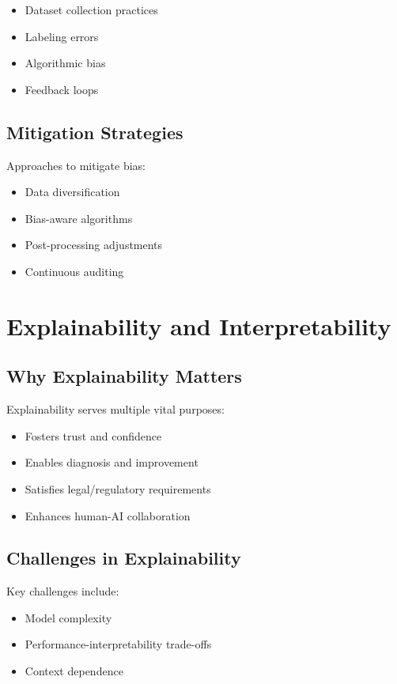 \documentclass[openany]{book}
\begin{document}
\begin{itemize}
    \item Dataset collection practices
    \item Labeling errors
    \item Algorithmic bias
    \item Feedback loops
\end{itemize}

\subsection{Mitigation Strategies}
Approaches to mitigate bias:

\begin{itemize}
    \item Data diversification
    \item Bias-aware algorithms
    \item Post-processing adjustments
    \item Continuous auditing
\end{itemize}

\section{Explainability and Interpretability}

\subsection{Why Explainability Matters}
Explainability serves multiple vital purposes:

\begin{itemize}
    \item Fosters trust and confidence
    \item Enables diagnosis and improvement
    \item Satisfies legal/regulatory requirements
    \item Enhances human-AI collaboration
\end{itemize}

\subsection{Challenges in Explainability}
Key challenges include:

\begin{itemize}
    \item Model complexity
    \item Performance-interpretability trade-offs
    \item Context dependence
\end{itemize}
\end{document}

